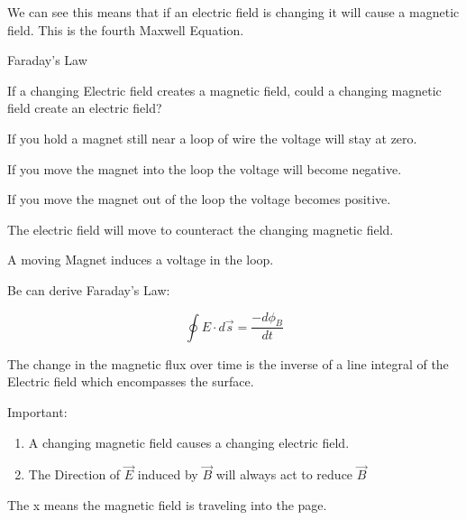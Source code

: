 \documentclass{report}
\begin{document}
\begin{description}
\begin{mdframed}
            We can see this means that if an electric field is
            changing it will cause a magnetic field.
            This is the fourth Maxwell Equation.
        \end{mdframed}
    \item {\large Faraday's Law}
        \begin{mdframed}
           If a changing Electric field creates a magnetic field,
           could a changing magnetic field create an electric field?

           If you hold a magnet still near a loop of wire
           the voltage will stay at zero.

           If you move the magnet into the loop 
           the voltage will become negative.

           If you move the magnet out of the loop
           the voltage becomes positive.

           The electric field will move to counteract
           the changing magnetic field.


           A moving Magnet induces a voltage in the
           loop.

           Be can derive Faraday's Law:

           \begin{displaymath}
               \oint E \cdot d\vec{s} = \frac{-d\phi_B}{dt} 
           \end{displaymath}

           The change in the magnetic flux over time
           is the inverse of a line integral of the Electric
           field which encompasses the surface.
           

           Important:
           \begin{enumerate}
               \item A changing magnetic field causes a changing
                   electric field.
               \item The Direction of $\vec{E}$ induced by
                   $\vec{B}$ will always act to reduce $\vec{B}$
           \end{enumerate}

           The x means the magnetic field is traveling into
           the page.
        \end{mdframed}
\end{description}
\end{document}
